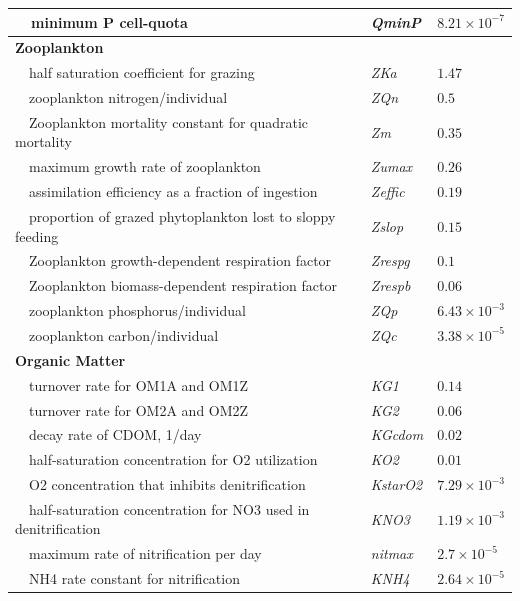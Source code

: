 \documentclass[preprint]{elsarticle}\usepackage[]{graphicx}\usepackage[]{color}
\begin{document}
\begin{table}[!tbp]
{\begin{center}
\begin{tabular}{lll}
~~minimum P cell-quota&\textit{QminP}&$8.21\times 10^{-7}$\tabularnewline
\hline
{\bfseries Zooplankton}&&\tabularnewline
~~half saturation coefficient for grazing&\textit{ZKa}&$1.47$\tabularnewline
~~zooplankton nitrogen/individual&\textit{ZQn}&$0.5$\tabularnewline
~~Zooplankton mortality constant for quadratic mortality&\textit{Zm}&$0.35$\tabularnewline
~~maximum growth rate of zooplankton&\textit{Zumax}&$0.26$\tabularnewline
~~assimilation efficiency as a fraction of ingestion&\textit{Zeffic}&$0.19$\tabularnewline
~~proportion of grazed phytoplankton lost to sloppy feeding&\textit{Zslop}&$0.15$\tabularnewline
~~Zooplankton growth-dependent respiration factor&\textit{Zrespg}&$0.1$\tabularnewline
~~Zooplankton biomass-dependent respiration factor&\textit{Zrespb}&$0.06$\tabularnewline
~~zooplankton phosphorus/individual&\textit{ZQp}&$6.43\times 10^{-3}$\tabularnewline
~~zooplankton carbon/individual&\textit{ZQc}&$3.38\times 10^{-5}$\tabularnewline
\hline
{\bfseries Organic Matter}&&\tabularnewline
~~turnover rate for OM1A and OM1Z&\textit{KG1}&$0.14$\tabularnewline
~~turnover rate for OM2A and OM2Z&\textit{KG2}&$0.06$\tabularnewline
~~decay rate of CDOM, 1/day&\textit{KGcdom}&$0.02$\tabularnewline
~~half-saturation concentration for O2 utilization&\textit{KO2}&$0.01$\tabularnewline
~~O2 concentration that inhibits denitrification&\textit{KstarO2}&$7.29\times 10^{-3}$\tabularnewline
~~half-saturation concentration for NO3 used in denitrification&\textit{KNO3}&$1.19\times 10^{-3}$\tabularnewline
~~maximum rate of nitrification per day&\textit{nitmax}&$2.7\times 10^{-5}$\tabularnewline
~~NH4 rate constant for nitrification&\textit{KNH4}&$2.64\times 10^{-5}$\tabularnewline
\hline
\end{tabular}\end{center}}
\end{table}


\clearpage

\end{document}
